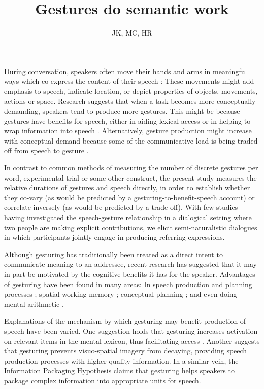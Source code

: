 \documentclass[a4paper,man,natbib]{apa6}
\title{Gestures do semantic work}
\author{JK, MC, HR}
\affiliation{Psychology, PPLS, University of Edinburgh}
\begin{document}
\maketitle

\noindent
During conversation, speakers often move their hands and arms in meaningful ways which co-express the content of their speech \citep{McNeill1992}: %
These movements might add emphasis to speech, indicate location, or depict properties of objects, movements, actions or space.
Research suggests that when a task becomes more conceptually demanding, speakers tend to produce more gestures.
This might be because gestures have benefits for speech, either in aiding lexical access \citep{Rauscher1996, Krauss2000} or in helping to wrap information into speech \citep{Kita2000}.
Alternatively, gesture production might increase with conceptual demand because some of the communicative load is being traded off from speech to gesture \citep{Melinger2004, Bangerter2004, DeRuiter2006}.

In contrast to common methods of measuring the number of discrete gestures per word, experimental trial or some other construct, the present study measures the relative durations of gestures and speech directly, in order to establish whether they co-vary (as would be predicted by a gesturing-to-benefit-speech account) or correlate inversely (as would be predicted by a trade-off).
With few studies having investigated the speech-gesture relationship in a dialogical setting where two people are making explicit contributions, we elicit semi-naturalistic dialogues in which participants jointly engage in producing referring expressions.

Although gesturing has traditionally been treated as a direct intent to communicate meaning to an addressee, recent research has suggested that it may in part be motivated by the cognitive benefits it has for the speaker.
Advantages of gesturing have been found in many areas: In speech production and planning processes \citep{Rauscher1996, Krauss1999, Rose2001, Morsella2004, Kita2000}; spatial working memory \citep{Wesp2001, Morsella2004}; conceptual planning \citep{Melinger2007}; and even doing mental arithmetic \citep{Goldin-Meadow2001}.

Explanations of the mechanism by which gesturing may benefit production of speech have been varied. 
One suggestion holds that gesturing increases activation on relevant items in the mental lexicon, thus facilitating access \citep{Krauss2000}. 
Another \citep{Hadar1997} suggests that gesturing prevents visuo-spatial imagery from decaying, providing speech production processes with higher quality information. 
In a similar vein, the Information Packaging Hypothesis \citep{Kita2000, Kita2003} claims that gesturing helps speakers to package complex information into appropriate units for speech. 
\end{document}
